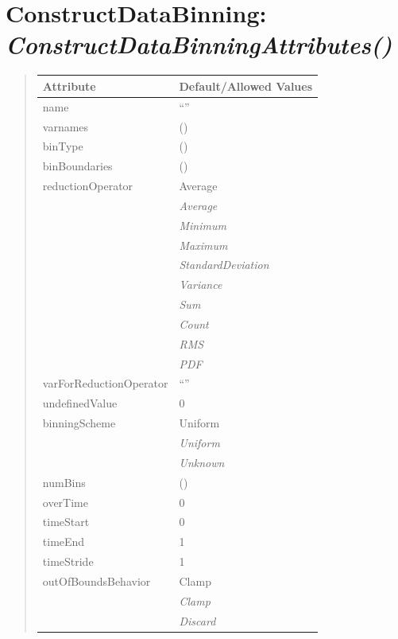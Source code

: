 \documentclass[letterpaper,10pt,english]{sphinxmanual}
\begin{document}
\section{\textbf{ConstructDataBinning}: \emph{ConstructDataBinningAttributes()}}
\label{attributes:constructdatabinning-constructdatabinningattributes}
\begin{DUlineblock}{0em}
\item[] 
\end{DUlineblock}
\begin{quote}

\begin{tabulary}{\linewidth}{|L|L|}
\hline

\textbf{Attribute}
 & 
\textbf{Default/Allowed Values}
\\
\hline
name
 & 
``''
\\
\hline
varnames
 & 
()
\\
\hline
binType
 & 
()
\\
\hline
binBoundaries
 & 
()
\\
\hline
reductionOperator
 & 
Average
\\
\hline & 
\emph{Average}
\\
\hline & 
\emph{Minimum}
\\
\hline & 
\emph{Maximum}
\\
\hline & 
\emph{StandardDeviation}
\\
\hline & 
\emph{Variance}
\\
\hline & 
\emph{Sum}
\\
\hline & 
\emph{Count}
\\
\hline & 
\emph{RMS}
\\
\hline & 
\emph{PDF}
\\
\hline
varForReductionOperator
 & 
``''
\\
\hline
undefinedValue
 & 
0
\\
\hline
binningScheme
 & 
Uniform
\\
\hline & 
\emph{Uniform}
\\
\hline & 
\emph{Unknown}
\\
\hline
numBins
 & 
()
\\
\hline
overTime
 & 
0
\\
\hline
timeStart
 & 
0
\\
\hline
timeEnd
 & 
1
\\
\hline
timeStride
 & 
1
\\
\hline
outOfBoundsBehavior
 & 
Clamp
\\
\hline & 
\emph{Clamp}
\\
\hline & 
\emph{Discard}
\\
\hline\end{tabulary}

\end{quote}
\end{document}
